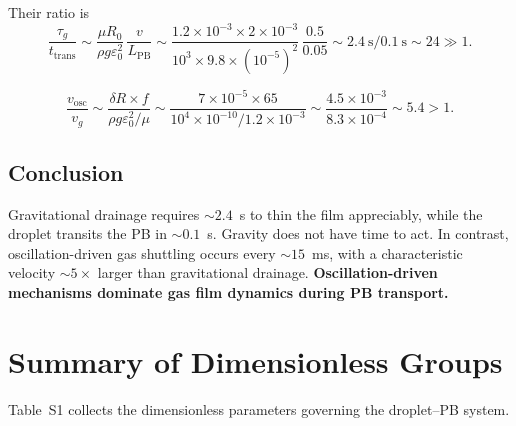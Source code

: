 \documentclass[%
 preprint,
 superscriptaddress,
 amsmath,amssymb,
 aps, prl,
]{revtex4-2}
\begin{document}
Their ratio is
\begin{equation}
\frac{\tau_g}{t_{\text{trans}}}
\sim \frac{\mu R_0}{\rho g \varepsilon_0^2}\,
\frac{v}{L_{\text{PB}}}
\sim \frac{1.2\times10^{-3} \times 2\times10^{-3}}
{10^3 \times 9.8 \times (10^{-5})^2}\,
\frac{0.5}{0.05}
\sim 2.4~\text{s} / 0.1~\text{s}
\sim 24 \gg 1.
\end{equation}

\begin{equation}
\frac{v_{\text{osc}}}{v_g}
\sim \frac{\delta R \times f}{\rho g \varepsilon_0^2/\mu}
\sim \frac{7\times10^{-5} \times 65}
{10^4 \times 10^{-10}/1.2\times10^{-3}}
\sim \frac{4.5\times10^{-3}}{8.3\times10^{-4}}
\sim 5.4 > 1.
\end{equation}

\subsection{Conclusion}

Gravitational drainage requires $\sim 2.4$~s to thin the film appreciably,
while the droplet transits the PB in $\sim 0.1$~s.  Gravity does not have
time to act.  In contrast, oscillation-driven gas shuttling occurs every
$\sim 15$~ms, with a characteristic velocity $\sim 5\times$ larger than
gravitational drainage.  \textbf{Oscillation-driven mechanisms dominate
gas film dynamics during PB transport.}

\section{Summary of Dimensionless Groups}

Table~S1 collects the dimensionless parameters governing the droplet--PB system.
\end{document}

